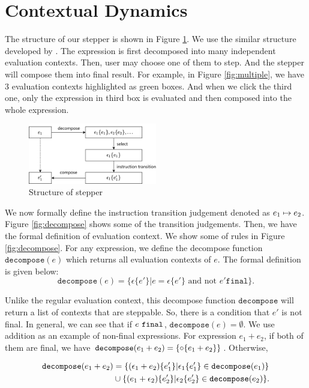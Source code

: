 \section{Contextual Dynamics}
\label{sec:condy}



The structure of our stepper is shown in Figure \ref{fig:structure}. We use the similar structure developed by \citet{cong_implementing_nodate}. The expression is first decomposed into many independent evaluation contexts. Then, user may choose one of them to step. And the stepper will compose them into final result. For example, in Figure \ref{fig:multiple}, we have 3 evaluation contexts highlighted as green boxes. And when we click the third one, only the expression in third box is evaluated and then composed into the whole expression.

\begin{figure}[htbp]
  \centering
  \includegraphics[width=0.5\textwidth]{img/struct.png}
  \caption{Structure of stepper}
  \label{fig:structure}
\end{figure}

We now formally define the instruction transition judgement denoted as $e_1 \mapsto e_2$. Figure \ref{fig:decompose} shows some of the transition judgements. Then, we have the formal definition of evaluation context. We show some of rules in Figure \ref{fig:decompose}. For any expression, we define the decompose function $\mathtt{decompose}(e)$ which returns all evaluation contexts of $e$. The formal definition is given below:
$$ \mathtt{decompose}(e) = \{ \epsilon\{e'\} | e = \epsilon\{e'\} \text{ and not } e' \mathtt{final} \}. $$

Unlike the regular evaluation context, this decompose function $\mathtt{decompose}$ will return a list of contexts that are steppable. So, there is a condition that $e'$ is not final. In general, we can see that if $e ~\mathtt{final}$, $\mathtt{decompose}(e) = \emptyset$. We use addition as an example of non-final expressions. For expression $e_1 + e_2$, if both of them are final, we have $\mathtt{decompose}(e_1 + e_2) = \{ \circ \{e_1+e_2\} \}$. Otherwise, 


\begin{align*}
  \mathtt{decompose}(e_1 + e_2) &= \{ (\epsilon_1 + e_2) \{e_1'\} | \epsilon_1 \{e_1'\} \in \mathtt{decompose}(e_1)\} \\
  &\cup \{ (e_1 + \epsilon_2) \{e_2'\} | \epsilon_2 \{e_2'\} \in \mathtt{decompose}(e_2)\}.
\end{align*}


